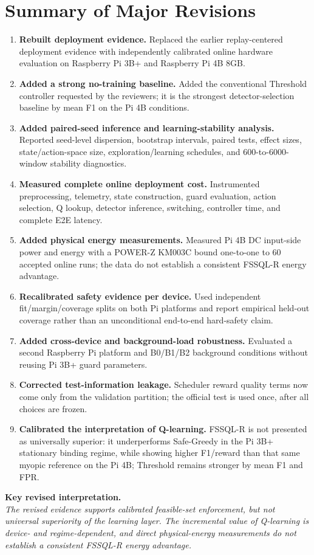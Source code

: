 \documentclass[11pt,a4paper]{article}
\begin{document}
\section*{Summary of Major Revisions}
\begin{authorresponsebox}
\begin{enumerate}[label=\textbf{C\arabic*.}]
\item \textbf{Rebuilt deployment evidence.} Replaced the earlier replay-centered deployment evidence with independently calibrated online hardware evaluation on Raspberry Pi 3B+ and Raspberry Pi 4B 8GB.
\item \textbf{Added a strong no-training baseline.} Added the conventional Threshold controller requested by the reviewers; it is the strongest detector-selection baseline by mean F1 on the Pi 4B conditions.
\item \textbf{Added paired-seed inference and learning-stability analysis.} Reported seed-level dispersion, bootstrap intervals, paired tests, effect sizes, state/action-space size, exploration/learning schedules, and 600-to-6000-window stability diagnostics.
\item \textbf{Measured complete online deployment cost.} Instrumented preprocessing, telemetry, state construction, guard evaluation, action selection, Q lookup, detector inference, switching, controller time, and complete E2E latency.
\item \textbf{Added physical energy measurements.} Measured Pi 4B DC input-side power and energy with a POWER-Z KM003C bound one-to-one to 60 accepted online runs; the data do not establish a consistent FSSQL-R energy advantage.
\item \textbf{Recalibrated safety evidence per device.} Used independent fit/margin/coverage splits on both Pi platforms and report empirical held-out coverage rather than an unconditional end-to-end hard-safety claim.
\item \textbf{Added cross-device and background-load robustness.} Evaluated a second Raspberry Pi platform and B0/B1/B2 background conditions without reusing Pi 3B+ guard parameters.
\item \textbf{Corrected test-information leakage.} Scheduler reward quality terms now come only from the validation partition; the official test is used once, after all choices are frozen.
\item \textbf{Calibrated the interpretation of Q-learning.} FSSQL-R is not presented as universally superior: it underperforms Safe-Greedy in the Pi 3B+ stationary binding regime, while showing higher F1/reward than that same myopic reference on the Pi 4B; Threshold remains stronger by mean F1 and FPR.
\end{enumerate}
\end{authorresponsebox}
\begin{excerptbox}
\textbf{Key revised interpretation.}\\[2pt]
\emph{The revised evidence supports calibrated feasible-set enforcement, but not universal superiority of the learning layer. The incremental value of Q-learning is device- and regime-dependent, and direct physical-energy measurements do not establish a consistent FSSQL-R energy advantage.}
\end{excerptbox}
\end{document}
